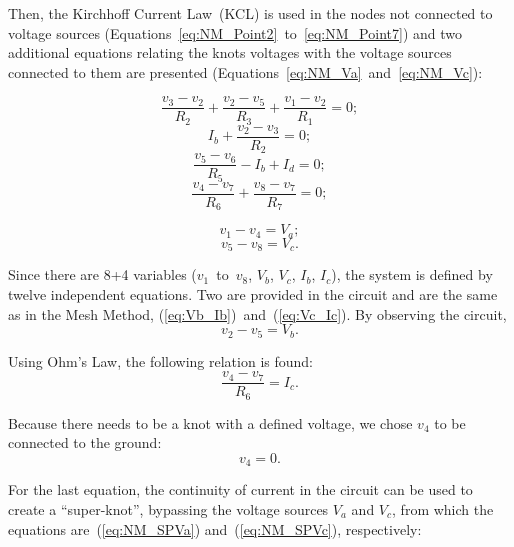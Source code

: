 Then, the Kirchhoff Current Law~(KCL) is used in the nodes not connected to voltage sources (Equations~\ref{eq:NM_Point2}~to~\ref{eq:NM_Point7}) and two additional equations relating the knots voltages with the voltage sources connected to them are presented (Equations~\ref{eq:NM_Va}~and~\ref{eq:NM_Vc}):

\begin{equation}
  \frac{v_3-v_2}{R_2} + \frac{v_2-v_5}{R_3} + \frac{v_1-v_2}{R_1} = 0;
  \label{eq:NM_Point2}
\end{equation}
\begin{equation}
  I_b + \frac{v_2-v_3}{R_2} = 0;	
  \label{eq:NM_Point3}
\end{equation}
\begin{equation}
  \frac{v_5-v_6}{R_5} - I_b + I_d = 0;
  \label{eq:NM_Point6}
\end{equation}
\begin{equation}
  \frac{v_4-v_7}{R_6} + \frac{v_8-v_7}{R_7} = 0;
  \label{eq:NM_Point7}
\end{equation}

\begin{equation}
  v_1 - v_4 = V_a;
  \label{eq:NM_Va}
\end{equation}
\begin{equation}
  v_5 - v_8 = V_c.
  \label{eq:NM_Vc}
\end{equation}

Since there are 8+4 variables ($v_1$~to~$v_8$, $V_b$, $V_c$, $I_b$, $I_c$), the system is defined by twelve independent equations. Two are provided in the circuit and are the same as in the Mesh Method, (\ref{eq:Vb_Ib})~and~(\ref{eq:Vc_Ic}).
By observing the circuit,
\begin{equation}
  v_2 - v_5 = V_b.
  \label{eq:NM_Vb}
\end{equation}

Using Ohm’s Law, the following relation is found:
\begin{equation}
  \frac{v_4-v_7}{R_6} = I_c.
  \label{eq:NM_OhmIc}
\end{equation}

Because there needs to be a knot with a defined voltage, we chose $v_4$ to be connected to the ground:
\begin{equation}
  v_4 = 0.
  \label{eq:NM_v4=0}
\end{equation}

For the last equation, the continuity of current in the circuit can be used to create a “super-knot”, bypassing the voltage sources $V_a$ and $V_c$, from which the equations are~(\ref{eq:NM_SPVa}) and~(\ref{eq:NM_SPVc}), respectively:

